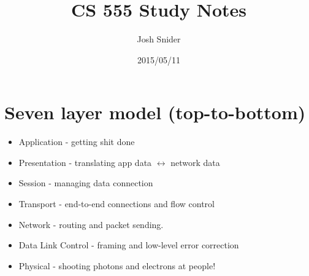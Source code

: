 \documentclass{scrartcl}
\begin{document}
\title{CS 555 Study Notes}
\author{Josh Snider}
\date{2015/05/11}
\maketitle
\section*{Seven layer model (top-to-bottom)}
\begin{itemize}
\item Application - getting shit done
\item Presentation - translating app data $\leftrightarrow$ network data  
\item Session - managing data connection
\item Transport - end-to-end connections and flow control
\item Network - routing and packet sending.
\item Data Link Control - framing and low-level error correction 
\item Physical - shooting photons and electrons at people!
\end{itemize}
\end{document}
